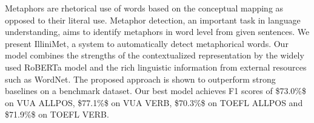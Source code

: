 Metaphors are rhetorical use of words based on the conceptual mapping as opposed to their literal use. Metaphor detection, an important task in language understanding, aims to identify metaphors in word level from given sentences. We present IlliniMet, a system to automatically detect metaphorical words. Our model combines the strengths of the contextualized representation by the widely used RoBERTa model and the rich linguistic information from external resources such as WordNet. The proposed approach is shown to outperform strong baselines on a benchmark dataset. Our best model achieves F1 scores of \$73.0\%\$ on VUA ALLPOS, \$77.1\%\$ on VUA VERB, \$70.3\%\$ on TOEFL ALLPOS and \$71.9\%\$ on TOEFL VERB.
